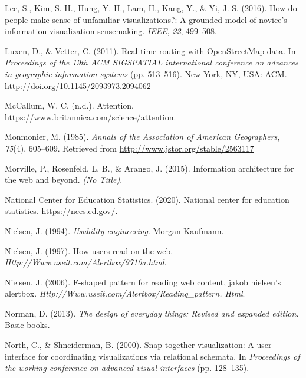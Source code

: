 \documentclass[print]{nuthesis}
\newlength{\cslhangindent}
\newenvironment{CSLReferences}[2]%
{\setlength{\parindent}{0pt}%
\everypar{\setlength{\hangindent}{\cslhangindent}}\ignorespaces}%
{\par}
\begin{document}
\begin{CSLReferences}{1}{0}
\leavevmode{}%
Lee, S., Kim, S.-H., Hung, Y.-H., Lam, H., Kang, Y., \& Yi, J. S. (2016). How do people make sense of unfamiliar visualizations?: A grounded model of novice's information visualization sensemaking. \emph{IEEE}, \emph{22}, 499--508.

\leavevmode{}%
Luxen, D., \& Vetter, C. (2011). Real-time routing with OpenStreetMap data. In \emph{Proceedings of the 19th ACM SIGSPATIAL international conference on advances in geographic information systems} (pp. 513--516). New York, NY, USA: ACM. http://doi.org/\href{https://doi.org/10.1145/2093973.2094062}{10.1145/2093973.2094062}

\leavevmode{}%
McCallum, W. C. (n.d.). Attention. \url{https://www.britannica.com/science/attention}.

\leavevmode{}%
Monmonier, M. (1985). \emph{Annals of the Association of American Geographers}, \emph{75}(4), 605--609. Retrieved from \url{http://www.jstor.org/stable/2563117}

\leavevmode{}%
Morville, P., Rosenfeld, L. B., \& Arango, J. (2015). Information architecture for the web and beyond. \emph{(No Title)}.

\leavevmode{}%
National Center for Education Statistics. (2020). National center for education statistics. \url{https://nces.ed.gov/}.

\leavevmode{}%
Nielsen, J. (1994). \emph{Usability engineering}. Morgan Kaufmann.

\leavevmode{}%
Nielsen, J. (1997). How users read on the web. \emph{Http://Www.useit.com/Alertbox/9710a.html}.

\leavevmode{}%
Nielsen, J. (2006). F-shaped pattern for reading web content, jakob nielsen's alertbox. \emph{Http://Www.useit.com/Alertbox/Reading\_pattern. Html}.

\leavevmode{}%
Norman, D. (2013). \emph{The design of everyday things: Revised and expanded edition}. Basic books.

\leavevmode{}%
North, C., \& Shneiderman, B. (2000). Snap-together visualization: A user interface for coordinating visualizations via relational schemata. In \emph{Proceedings of the working conference on advanced visual interfaces} (pp. 128--135).


\end{CSLReferences}
\end{document}

